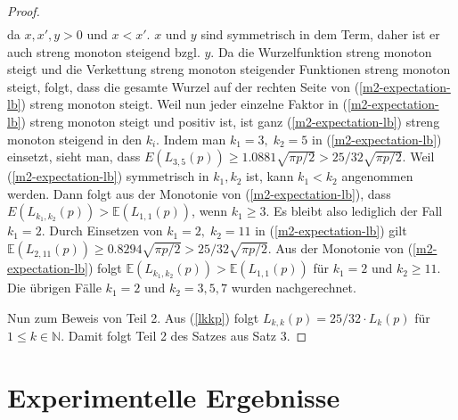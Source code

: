 \documentclass[a4paper, 10pt, ngerman]{article}
\newcommand{\E}{\mathbb{E}}
\newcommand{\N}{\mathbb{N}}
\begin{document}
\begin{proof}
\begin{align*}
        \end{align*}
        da $x, x', y > 0$ und $x < x'$. $x$ und $y$ sind symmetrisch in dem Term, daher ist er auch streng monoton steigend bzgl. $y$. Da die Wurzelfunktion streng monoton steigt und die Verkettung streng monoton steigender Funktionen streng monoton steigt, folgt, dass die gesamte Wurzel auf der rechten Seite von (\ref{m2-expectation-lb}) streng monoton steigt. Weil nun jeder einzelne Faktor in (\ref{m2-expectation-lb}) streng monoton steigt und positiv ist, ist ganz (\ref{m2-expectation-lb}) streng monoton steigend in den $k_i$. Indem man $k_1 = 3,\; k_2 = 5$ in (\ref{m2-expectation-lb}) einsetzt, sieht man, dass $E(L_{3, 5}(p)) \ge 1.0881 \sqrt{\pi p /2}  > 25 / 32 \sqrt{\pi p / 2}$. Weil (\ref{m2-expectation-lb}) symmetrisch in $k_1, k_2$ ist, kann $k_1 < k_2$ angenommen werden. Dann folgt aus der Monotonie von (\ref{m2-expectation-lb}), dass $E(L_{k_1, k_2}(p)) > \E(L_{1, 1}(p))$, wenn $k_1 \ge 3$. Es bleibt also lediglich der Fall $k_1 = 2$. Durch Einsetzen von $k_1 = 2, \; k_2 = 11$ in (\ref{m2-expectation-lb}) gilt $\E(L_{2, 11}(p)) \ge 0.8294 \sqrt{\pi p / 2} > 25 / 32 \sqrt{\pi p / 2}$. Aus der Monotonie von (\ref{m2-expectation-lb}) folgt $\E(L_{k_1, k_2}(p)) > \E(L_{1, 1}(p))$ für $k_1 = 2$ und $k_2 \ge 11$. Die übrigen Fälle $k_1 = 2$ und $k_2 = 3, 5, 7$ wurden nachgerechnet.

        Nun zum Beweis von Teil 2. Aus (\ref{lkkp}) folgt $L_{k, k}(p) = 25 / 32 \cdot L_{k}(p)$ für $1 \le k \in \N$. Damit folgt Teil 2 des Satzes aus Satz 3.
    \end{proof}

    \section{Experimentelle Ergebnisse}
\end{document}
